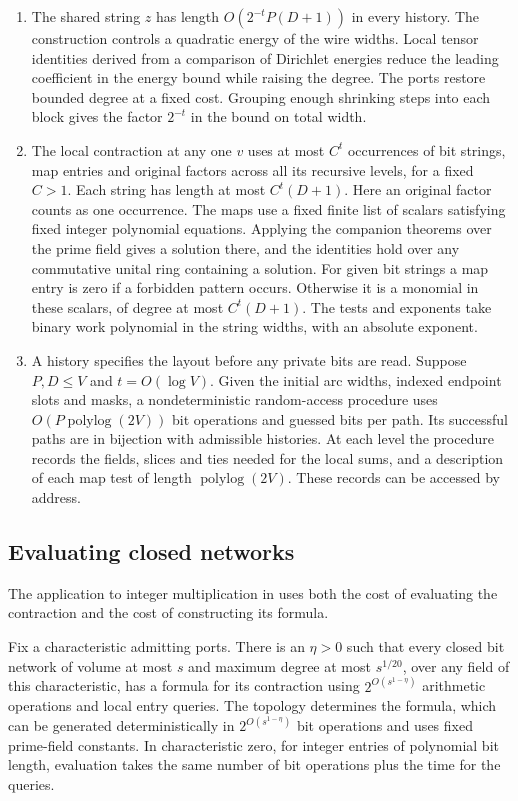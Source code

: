 \begin{enumerate}
\item The shared string $z$ has length $O(2^{-t}P(D+1))$ in every
history. The construction controls a quadratic energy of the wire
widths. Local tensor identities derived from a comparison of
Dirichlet energies reduce the leading coefficient in the energy bound
while raising the degree. The ports restore bounded degree at a fixed
cost. Grouping enough shrinking steps into each block gives the factor
$2^{-t}$ in the bound on total width.

\item The local contraction at any one $v$ uses at most $C^t$
occurrences of bit strings, map entries and original factors across
all its recursive levels, for a fixed $C>1$. Each string has length
at most $C^t(D+1)$. Here an original factor counts as one occurrence.
The maps use a fixed finite list of scalars satisfying fixed integer
polynomial equations. Applying the companion theorems over the prime
field gives a solution there, and the identities hold over any
commutative unital ring containing a solution. For given bit strings
a map entry is zero if a forbidden pattern occurs. Otherwise it is a
monomial in these scalars, of degree at most $C^t(D+1)$. The tests
and exponents take binary work polynomial in the string widths, with
an absolute exponent.

\item A history specifies the layout before any private bits are
read. Suppose $P,D\le V$ and $t=O(\log V)$. Given the initial arc
widths, indexed endpoint slots and masks, a nondeterministic
random-access procedure uses $O(P\operatorname{polylog}(2V))$ bit
operations and guessed bits per path. Its successful paths are in
bijection with admissible histories. At each level the procedure
records the fields, slices and ties needed for the local sums, and a
description of each map test of length $\operatorname{polylog}(2V)$.
These records can be accessed by address.
\end{enumerate}

\subsection{Evaluating closed networks}

The application to integer multiplication in \cite{oaT} uses both the cost
of evaluating the contraction and the cost of constructing its formula.

\begin{theorem}\label{thm:closed}
Fix a characteristic admitting ports. There is an $\eta>0$ such that
every closed bit network of volume at most $s$ and maximum degree at
most $s^{1/20}$, over any field of this characteristic, has a formula
for its contraction using $2^{O(s^{1-\eta})}$ arithmetic operations
and local entry queries. The topology determines the formula, which
can be generated deterministically in $2^{O(s^{1-\eta})}$ bit
operations and uses fixed prime-field constants. In characteristic
zero, for integer entries of polynomial bit length, evaluation takes
the same number of bit operations plus the time for the queries.
\end{theorem}

